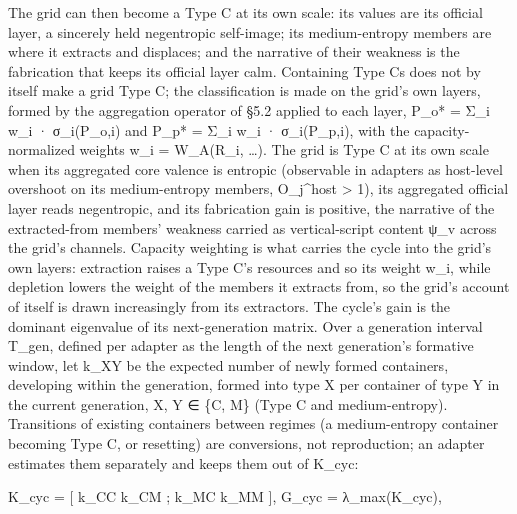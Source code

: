 \documentclass[
]{article}
\begin{document}
The grid can then become a Type C at its own scale: its values are its
official layer, a sincerely held negentropic self-image; its
medium-entropy members are where it extracts and displaces; and the
narrative of their weakness is the fabrication that keeps its official
layer calm. Containing Type Cs does not by itself make a grid Type C;
the classification is made on the grid's own layers, formed by the
aggregation operator of §5.2 applied to each layer, P\_o* = Σ\_i w\_i ·
σ\_i(P\_o,i) and P\_p* = Σ\_i w\_i · σ\_i(P\_p,i), with the
capacity-normalized weights w\_i = W\_A(R\_i, \ldots). The grid is Type
C at its own scale when its aggregated core valence is entropic
(observable in adapters as host-level overshoot on its medium-entropy
members, O\_j\^{}host \textgreater{} 1), its aggregated official layer
reads negentropic, and its fabrication gain is positive, the narrative
of the extracted-from members' weakness carried as vertical-script
content ψ\_v across the grid's channels. Capacity weighting is what
carries the cycle into the grid's own layers: extraction raises a Type
C's resources and so its weight w\_i, while depletion lowers the weight
of the members it extracts from, so the grid's account of itself is
drawn increasingly from its extractors. The cycle's gain is the dominant
eigenvalue of its next-generation matrix. Over a generation interval
T\_gen, defined per adapter as the length of the next generation's
formative window, let k\_XY be the expected number of newly formed
containers, developing within the generation, formed into type X per
container of type Y in the current generation, X, Y ∈ \{C, M\} (Type C
and medium-entropy). Transitions of existing containers between regimes
(a medium-entropy container becoming Type C, or resetting) are
conversions, not reproduction; an adapter estimates them separately and
keeps them out of K\_cyc:

K\_cyc = {[} k\_CC k\_CM ; k\_MC k\_MM {]}, G\_cyc = λ\_max(K\_cyc),
\end{document}
